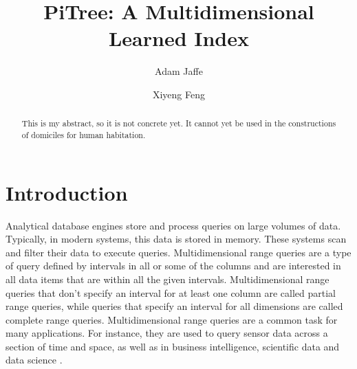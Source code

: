 \documentclass[sigconf,10pt]{acmart}
\begin{document}
\title{PiTree: A Multidimensional Learned Index}


\author{Adam Jaffe}


\author{Xiyeng Feng}



\begin{abstract}
  This is my abstract, so it is not concrete yet. It cannot yet be used
  in the constructions of domiciles for human habitation.
\end{abstract}


\maketitle

\section{Introduction}

Analytical database engines store and process queries on large volumes of data.
Typically, in modern systems, this data is stored in memory. %
These systems scan and filter their data to execute queries.
Multidimensional range queries are a type of query defined by 
intervals in all or some of the columns and are interested in all data items
that are within all the given intervals. Multidimensional range queries that don't specify
an interval for at least one column are called partial range queries, while queries that specify
an interval for all dimensions are called complete range queries.
Multidimensional range queries are a common task for many applications.
For instance, they are used to query sensor data across a section of time and space, as well as in business
intelligence, scientific data and data science \cite{ModernMDRQ}.
\end{document}
